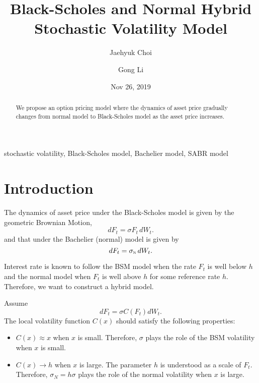 \documentclass[authoryear,reqno,12pt,a4paper]{elsarticle}
\newcommand{\norm}{\textsc{n}}
\begin{document}
\begin{frontmatter}

\title{Black-Scholes and Normal Hybrid Stochastic Volatility Model}

\author[phbs]{Jaehyuk Choi}

\author[phbs]{Gong Li}

\address[phbs]{Peking University HSBC Business School, Shenzhen, China}


\date{Nov 26, 2019}

\begin{abstract}
We propose an option pricing model where the dynamics of asset price gradually changes from normal model to Black-Scholes model as the asset price increases.
\end{abstract}

\begin{keyword}
	stochastic volatility, Black-Scholes model, Bachelier model, SABR model
\end{keyword}
\end{frontmatter}


\section{Introduction}
The dynamics of asset price under the Black-Scholes model is given by the geometric Brownian Motion,
$$ dF_t = \sigma F_t\, dW_t. $$  
and that under the Bachelier (normal) model is given by
$$ dF_t = \sigma_\norm\, dW_t. $$  

Interest rate is known to follow the BSM model when the rate $F_t$ is well below $h$ and the normal model when $F_t$ is well above $h$ for some reference rate $h$. Therefore, we want to construct a hybrid model.

Assume
$$ dF_t = \sigma C(F_t) dW_t. $$  
The local volatility function $C(x)$ should satisfy the following properties:
\begin{itemize}
	\item $C(x)\approx x$ when $x$ is small. Therefore, $\sigma$ plays the role of the BSM volatility when $x$ is small.
	\item $C(x)\rightarrow h$ when $x$ is large. The parameter $h$ is understood as a scale of $F_t$. Therefore, $\sigma_N = h \sigma$ plays the role of the normal volatility when $x$ is large.
\end{itemize}
\end{document}
